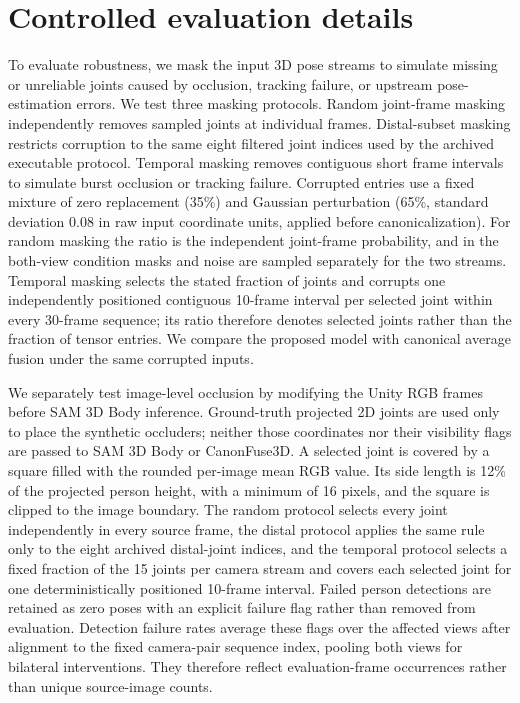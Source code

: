 \documentclass[11pt,letterpaper]{article}
\begin{document}
\section{Controlled evaluation details}
\label{sec:controlled_details}
To evaluate robustness, we mask the input 3D pose streams to simulate missing or unreliable joints caused by occlusion, tracking failure, or upstream pose-estimation errors. We test three masking protocols. Random joint-frame masking independently removes sampled joints at individual frames. Distal-subset masking restricts corruption to the same eight filtered joint indices used by the archived executable protocol. Temporal masking removes contiguous short frame intervals to simulate burst occlusion or tracking failure. Corrupted entries use a fixed mixture of zero replacement (35\%) and Gaussian perturbation (65\%, standard deviation 0.08 in raw input coordinate units, applied before canonicalization). For random masking the ratio is the independent joint-frame probability, and in the both-view condition masks and noise are sampled separately for the two streams. Temporal masking selects the stated fraction of joints and corrupts one independently positioned contiguous 10-frame interval per selected joint within every 30-frame sequence; its ratio therefore denotes selected joints rather than the fraction of tensor entries. We compare the proposed model with canonical average fusion under the same corrupted inputs.

We separately test image-level occlusion by modifying the Unity RGB frames before SAM 3D Body inference. Ground-truth projected 2D joints are used only to place the synthetic occluders; neither those coordinates nor their visibility flags are passed to SAM 3D Body or CanonFuse3D. A selected joint is covered by a square filled with the rounded per-image mean RGB value. Its side length is 12\% of the projected person height, with a minimum of 16 pixels, and the square is clipped to the image boundary. The random protocol selects every joint independently in every source frame, the distal protocol applies the same rule only to the eight archived distal-joint indices, and the temporal protocol selects a fixed fraction of the 15 joints per camera stream and covers each selected joint for one deterministically positioned 10-frame interval. Failed person detections are retained as zero poses with an explicit failure flag rather than removed from evaluation. Detection failure rates average these flags over the affected views after alignment to the fixed camera-pair sequence index, pooling both views for bilateral interventions. They therefore reflect evaluation-frame occurrences rather than unique source-image counts.
\end{document}
